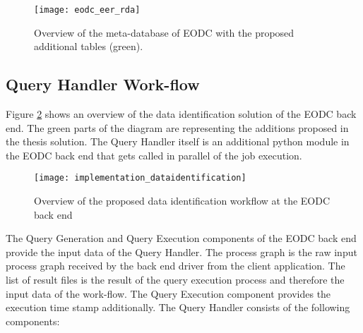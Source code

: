\documentclass[draft,final]{vutinfth} %
\begin{document}
\begin{figure}[h]
	\centering
	\texttt{[image: eodc\_eer\_rda]}
	\caption{Overview of the meta-database of EODC with the proposed additional tables (green).}
	\label{fig:eer_rda} %
\end{figure}

\subsection{Query Handler Work-flow}
Figure \ref{fig:impldataid} shows an overview of the data identification solution of the EODC back end. The green parts of the diagram are representing the additions proposed in the thesis solution. The Query Handler itself is an additional python module in the EODC back end that gets called in parallel of the job execution. 

\begin{figure}[h]
	\centering
	\texttt{[image: implementation\_dataidentification]}
	\caption{Overview of the proposed data identification workflow at the EODC back end}
	\label{fig:impldataid} %
\end{figure}

The Query Generation and Query Execution components of the EODC back end provide the input data of the Query Handler. The process graph is the raw input process graph received by the back end driver from the client application. The list of result files is the result of the query execution process and therefore the input data of the work-flow. The Query Execution component provides the execution time stamp additionally. The Query Handler consists of the following components:
\end{document}
